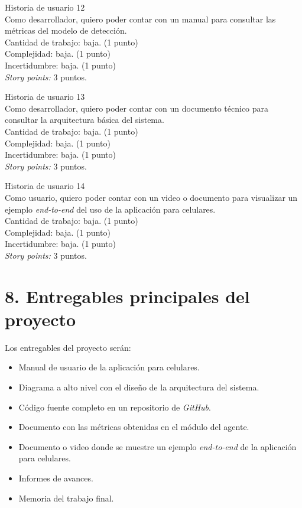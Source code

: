 \documentclass[
11pt, %
]{charter}
\begin{document}
Historia de usuario 12 \\
Como desarrollador, quiero poder contar con un manual para consultar las métricas del modelo de detección.\\
Cantidad de trabajo: baja. (1 punto)\\
Complejidad: baja. (1 punto)\\
Incertidumbre: baja. (1 punto)\\
\textit{Story points:} 3 puntos.

Historia de usuario 13 \\
Como desarrollador, quiero poder contar con un documento técnico para consultar la arquitectura básica del sistema.\\
Cantidad de trabajo: baja. (1 punto)\\
Complejidad: baja. (1 punto)\\
Incertidumbre: baja. (1 punto)\\
\textit{Story points:} 3 puntos.

Historia de usuario 14 \\
Como usuario, quiero poder contar con un video o documento para visualizar un ejemplo \textit{end-to-end} del uso de la aplicación para celulares.\\
Cantidad de trabajo: baja. (1 punto)\\
Complejidad: baja. (1 punto)\\
Incertidumbre: baja. (1 punto)\\
\textit{Story points:} 3 puntos.


\section{8. Entregables principales del proyecto}
\label{sec:entregables}
Los entregables del proyecto serán:
\begin{itemize}
	\item Manual de usuario de la aplicación para celulares.
	\item Diagrama a alto nivel con el diseño de la arquitectura del sistema.
	\item Código fuente completo en un repositorio de \textit{GitHub}.
	\item Documento con las métricas obtenidas en el módulo del agente.
	\item Documento o video donde se muestre un ejemplo \textit{end-to-end} de la aplicación para celulares.
	\item Informes de avances.
	\item Memoria del trabajo final.
\end{itemize}
\end{document}

